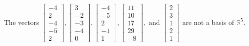 \begin{exercise}
\begin{exerciseStatement}
  \end{exerciseStatement}
  \begin{exerciseAnswer}
   The vectors \(\left[\begin{array}{r}
-4 \\
2 \\
-4 \\
-5 \\
2
\end{array}\right] , \left[\begin{array}{r}
3 \\
-2 \\
-3 \\
-4 \\
0
\end{array}\right] , \left[\begin{array}{r}
-4 \\
-5 \\
2 \\
-1 \\
1
\end{array}\right] , \left[\begin{array}{r}
11 \\
10 \\
17 \\
29 \\
-8
\end{array}\right] , \text{ and } \left[\begin{array}{r}
2 \\
3 \\
1 \\
2 \\
1
\end{array}\right]\) 
  	 are not  a basis of \(\mathbb{R}^5\).
  


  \end{exerciseAnswer}
\end{exercise}